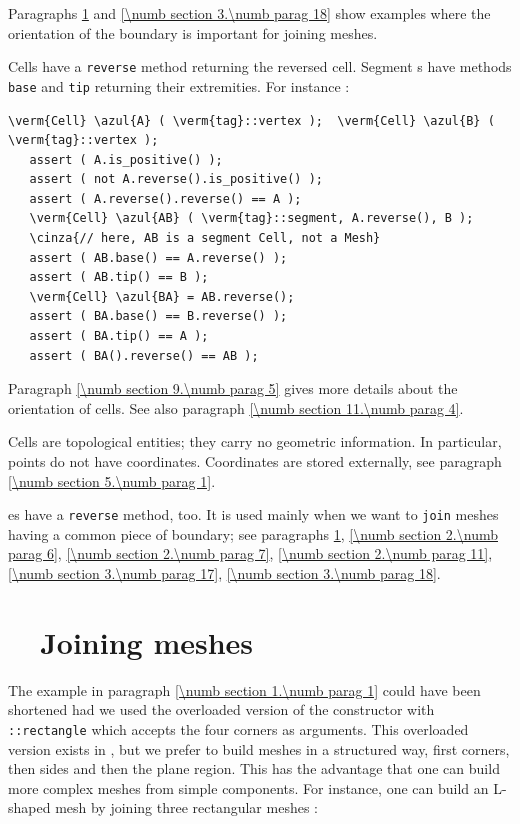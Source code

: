 Paragraphs \ref{\numb section 1.\numb parag 3} and \ref{\numb section 3.\numb parag 18}
show examples where the orientation of the boundary is important for joining meshes.

Cells have a {\small\tt reverse} method returning the reversed cell.
Segment {\small\tt {}}s have methods {\small\tt base} and {\small\tt tip} returning their extremities.
For instance :

\begin{Verbatim}[commandchars=\\\{\},formatcom=\small\tt,baselinestretch=0.94]
   \verm{Cell} \azul{A} ( \verm{tag}::vertex );  \verm{Cell} \azul{B} ( \verm{tag}::vertex );
   assert ( A.is_positive() );
   assert ( not A.reverse().is_positive() );
   assert ( A.reverse().reverse() == A );
   \verm{Cell} \azul{AB} ( \verm{tag}::segment, A.reverse(), B );
   \cinza{// here, AB is a segment Cell, not a Mesh}
   assert ( AB.base() == A.reverse() );
   assert ( AB.tip() == B );
   \verm{Cell} \azul{BA} = AB.reverse();
   assert ( BA.base() == B.reverse() );
   assert ( BA.tip() == A );
   assert ( BA().reverse() == AB );
\end{Verbatim}

Paragraph \ref{\numb section 9.\numb parag 5} gives more details about the orientation of cells.
See also paragraph \ref{\numb section 11.\numb parag 4}.

Cells are topological entities; they carry no geometric information.
In particular, points do not have coordinates.
Coordinates are stored externally, see paragraph \ref{\numb section 5.\numb parag 1}.

{\small\tt {}}es have a {\small\tt reverse} method, too.
It is used mainly when we want to {\small\tt join} meshes having a common piece of boundary;
see paragraphs \ref{\numb section 1.\numb parag 3}, \ref{\numb section 2.\numb parag 6},
\ref{\numb section 2.\numb parag 7}, \ref{\numb section 2.\numb parag 11},
\ref{\numb section 3.\numb parag 17}, \ref{\numb section 3.\numb parag 18}.


\section{~~Joining meshes}\label{\numb section 1.\numb parag 3}

The example in paragraph \ref{\numb section 1.\numb parag 1} could have been shortened
had we used the overloaded version of the {\small\tt {}} constructor with
{\small\tt {}::rectangle} which accepts the four corners as arguments. 
This overloaded version exists in \maniFEM, but we prefer to build meshes in a structured way, 
first corners, then sides and then the plane region. 
This has the advantage that one can build more complex meshes from simple components. 
For instance, one can build an L-shaped mesh by joining three rectangular meshes :

